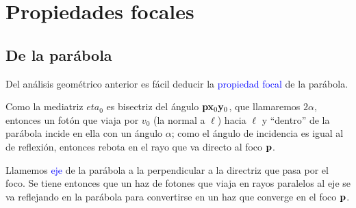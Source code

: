 \documentclass{article}
\theoremstyle{definicion}
\theoremstyle{definition}             %
\theoremstyle{definition}             %
\theoremstyle{definition}
\theoremstyle{definition}
\theoremstyle{observacion}
\theoremstyle{definition}
\theoremstyle{plain}
\theoremstyle{definition}
\theoremstyle{afirmacion}
\theoremstyle{notation}
\theoremstyle{definition}
\begin{document}
    \section{Propiedades focales}

    \subsection{De la parábola}

    Del análisis geométrico anterior es fácil deducir la \textcolor{blue}{propiedad focal} de la parábola.

    Como la mediatriz \(eta_{0}\) es bisectriz del ángulo \(\vb{p}\vb{x}_{0}\vb{y}_{0}\), que llamaremos \(2\alpha\), entonces un fotón que viaja por \(v_{0}\) (la normal a \(\ell\)) hacia \(\ell\) y ``dentro'' de la parábola incide en ella con un ángulo \(\alpha\); como el ángulo de incidencia es igual al de reflexión, entonces rebota en el rayo que va directo al foco \(\vb{p}\).

    Llamemos \textcolor{blue}{eje} de la parábola a la perpendicular a la directriz que pasa por el foco. Se tiene entonces que un haz de fotones que viaja en rayos paralelos al eje se va reflejando en la parábola para convertirse en un haz que converge en el foco \(\vb{p}\).




\end{document}
